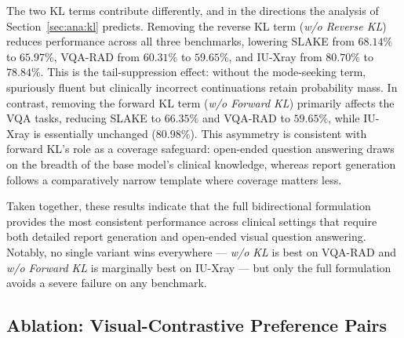 The two KL terms contribute differently, and in the directions the analysis of Section~\ref{sec:ana:kl} predicts. Removing the reverse KL term (\emph{w/o Reverse KL}) reduces performance across all three benchmarks, lowering SLAKE from $68.14\%$ to $65.97\%$, VQA-RAD from $60.31\%$ to $59.65\%$, and IU-Xray from $80.70\%$ to $78.84\%$. This is the tail-suppression effect: without the mode-seeking term, spuriously fluent but clinically incorrect continuations retain probability mass. In contrast, removing the forward KL term (\emph{w/o Forward KL}) primarily affects the VQA tasks, reducing SLAKE to $66.35\%$ and VQA-RAD to $59.65\%$, while IU-Xray is essentially unchanged ($80.98\%$). This asymmetry is consistent with forward KL's role as a coverage safeguard: open-ended question answering draws on the breadth of the base model's clinical knowledge, whereas report generation follows a comparatively narrow template where coverage matters less.

Taken together, these results indicate that the full bidirectional formulation provides the most consistent performance across clinical settings that require both detailed report generation and open-ended visual question answering. Notably, no single variant wins everywhere --- \emph{w/o KL} is best on VQA-RAD and \emph{w/o Forward KL} is marginally best on IU-Xray --- but only the full formulation avoids a severe failure on any benchmark.

\subsection{Ablation: Visual-Contrastive Preference Pairs}
\label{sec:res:abl-visual}

